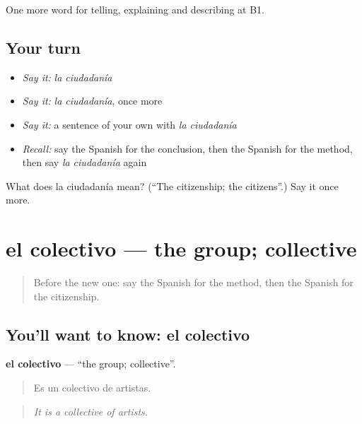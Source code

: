 \begin{grammarlens}[title={What you've built}]
One more word for telling, explaining and describing at B1.
\end{grammarlens}

\subsection*{Your turn}
\begin{itemize}
\raggedright
  \item \emph{Say it:} \emph{la ciudadanía}
  \item \emph{Say it:} \emph{la ciudadanía}, once more
  \item \emph{Say it:} a sentence of your own with \emph{la ciudadanía}
  \item \emph{Recall:} say the Spanish for the conclusion, then the Spanish for the method, then say \emph{la ciudadanía} again
\end{itemize}

\begin{tcolorbox}[breakable,colback=teal!4,colframe=teal!35!black,title={Before you move on}]
What does la ciudadanía mean? (\textquotedblleft{}The citizenship; the citizens\textquotedblright{}.) Say it once more.
\end{tcolorbox}
\section[el colectivo]{el colectivo — the group; collective}

\label{lesson:ES-C600-colectivo}



\begin{quote}
Before the new one: say the Spanish for the method, then the Spanish for the citizenship.
\end{quote}

\subsection*{You'll want to know: el colectivo}
\textbf{el colectivo} — \textquotedblleft{}the group; collective\textquotedblright{}.

\begin{quote}
Es un colectivo de artistas.
\end{quote}

\begin{quote}
\emph{It is a collective of artists.}
\end{quote}

